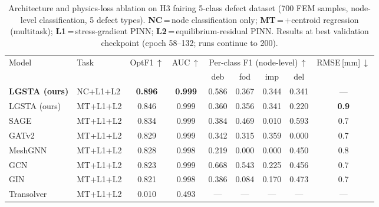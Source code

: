 \begin{table}[t]
\centering
\caption{Architecture and physics-loss ablation on H3 fairing 5-class defect dataset
         (700 FEM samples, node-level classification, 5 defect types).
         \textbf{NC}\,=\,node classification only;
         \textbf{MT}\,=\,+centroid regression (multitask);
         \textbf{L1}\,=\,stress-gradient PINN;
         \textbf{L2}\,=\,equilibrium-residual PINN.
         Results at best validation checkpoint (epoch 58--132; runs continue to 200).}
\label{tab:arch_ablation}
\begin{tabular}{llccccccc}
\toprule
Model & Task & OptF1\,$\uparrow$ & AUC\,$\uparrow$
      & \multicolumn{4}{c}{Per-class F1 (node-level)\,$\uparrow$}
      & RMSE\,[mm]\,$\downarrow$ \\
\cmidrule(lr){5-8}
      &      &        &       & deb   & fod   & imp   & del   &      \\
\midrule
\textbf{LGSTA (ours)} & NC+L1+L2 & \textbf{0.896} & \textbf{0.999} & 0.586 & 0.367 & 0.344 & 0.341 & --- \\
LGSTA (ours)          & MT+L1+L2 & 0.846 & 0.999 & 0.360 & 0.356 & 0.341 & 0.220 & \textbf{0.9} \\
\midrule
SAGE                  & MT+L1+L2 & 0.834 & 0.999 & 0.384 & 0.469 & 0.010 & 0.593 & 0.7 \\
GATv2                 & MT+L1+L2 & 0.829 & 0.999 & 0.342 & 0.315 & 0.359 & 0.000 & 0.7 \\
MeshGNN               & MT+L1+L2 & 0.828 & 0.998 & 0.219 & 0.000 & 0.000 & 0.450 & 0.8 \\
GCN                   & MT+L1+L2 & 0.823 & 0.999 & 0.668 & 0.543 & 0.225 & 0.456 & 0.7 \\
GIN                   & MT+L1+L2 & 0.821 & 0.998 & 0.386 & 0.084 & 0.170 & 0.473 & 0.7 \\
\midrule
Transolver            & MT+L1+L2 & 0.010 & 0.493 & ---   & ---   & ---   & ---   & --- \\
\bottomrule
\end{tabular}
\end{table}

